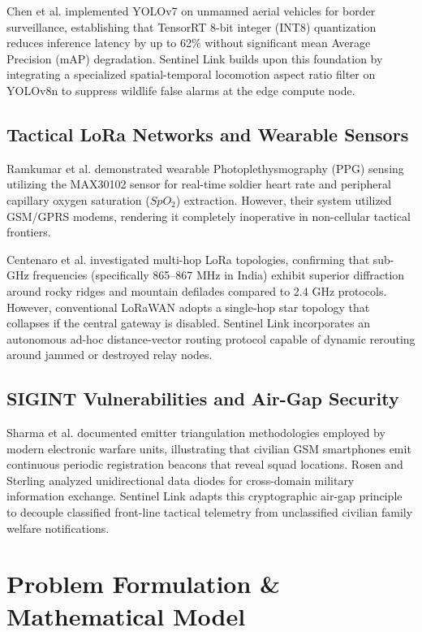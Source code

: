\documentclass[conference]{IEEEtran}
\begin{document}
Chen et al. \cite{chen2023} implemented YOLOv7 on unmanned aerial vehicles for border surveillance, establishing that TensorRT 8-bit integer (INT8) quantization reduces inference latency by up to 62\% without significant mean Average Precision (mAP) degradation. Sentinel Link builds upon this foundation by integrating a specialized spatial-temporal locomotion aspect ratio filter on YOLOv8n to suppress wildlife false alarms at the edge compute node.

\subsection{Tactical LoRa Networks and Wearable Sensors}
Ramkumar et al. \cite{ramkumar2022} demonstrated wearable Photoplethysmography (PPG) sensing utilizing the MAX30102 sensor for real-time soldier heart rate and peripheral capillary oxygen saturation ($SpO_2$) extraction. However, their system utilized GSM/GPRS modems, rendering it completely inoperative in non-cellular tactical frontiers.

Centenaro et al. \cite{centenaro2021} investigated multi-hop LoRa topologies, confirming that sub-GHz frequencies (specifically 865--867 MHz in India) exhibit superior diffraction around rocky ridges and mountain defilades compared to 2.4 GHz protocols. However, conventional LoRaWAN adopts a single-hop star topology that collapses if the central gateway is disabled. Sentinel Link incorporates an autonomous ad-hoc distance-vector routing protocol capable of dynamic rerouting around jammed or destroyed relay nodes.

\subsection{SIGINT Vulnerabilities and Air-Gap Security}
Sharma et al. \cite{sharma2022} documented emitter triangulation methodologies employed by modern electronic warfare units, illustrating that civilian GSM smartphones emit continuous periodic registration beacons that reveal squad locations. Rosen and Sterling \cite{rosen2022} analyzed unidirectional data diodes for cross-domain military information exchange. Sentinel Link adapts this cryptographic air-gap principle to decouple classified front-line tactical telemetry from unclassified civilian family welfare notifications.

\section{Problem Formulation \& Mathematical Model}
\end{document}
